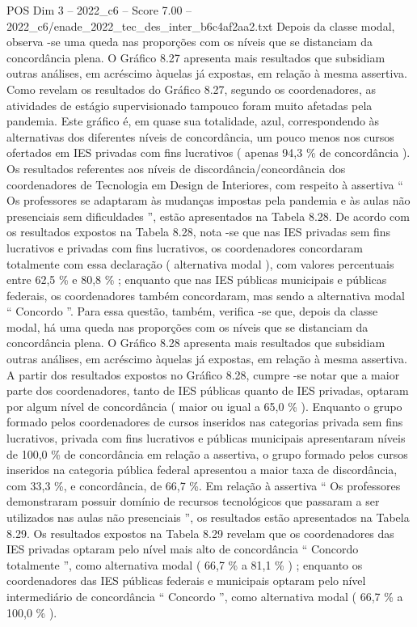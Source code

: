 \begin{textsample}{POS Dim 3 – 2022\_c6 – Score 7.00 – 2022\_c6/enade\_2022\_tec\_des\_inter\_b6c4af2aa2.txt}
Depois da classe modal, observa -se uma queda nas proporções com os níveis que se distanciam da concordância plena.
O Gráfico 8.27 apresenta mais resultados que subsidiam outras análises, em acréscimo àquelas já expostas, em relação à mesma assertiva.
Como revelam os resultados do Gráfico 8.27, segundo os coordenadores, as atividades de estágio supervisionado tampouco foram muito afetadas pela pandemia.
Este gráfico é, em quase sua totalidade, azul, correspondendo às alternativas dos diferentes níveis de concordância, um pouco menos nos cursos ofertados em IES privadas com fins lucrativos ( apenas 94,3 \% de concordância ).
Os resultados referentes aos níveis de discordância/concordância dos coordenadores de Tecnologia em Design de Interiores, com respeito à assertiva “ Os professores se adaptaram às mudanças impostas pela pandemia e às aulas não presenciais sem dificuldades ”, estão apresentados na Tabela 8.28.
De acordo com os resultados expostos na Tabela 8.28, nota -se que nas IES privadas sem fins lucrativos e privadas com fins lucrativos, os coordenadores concordaram totalmente com essa declaração ( alternativa modal ), com valores percentuais entre 62,5 \% e 80,8 \% ; enquanto que nas IES públicas municipais e públicas federais, os coordenadores também concordaram, mas sendo a alternativa modal “ Concordo ”.
Para essa questão, também, verifica -se que, depois da classe modal, há uma queda nas proporções com os níveis que se distanciam da concordância plena.
O Gráfico 8.28 apresenta mais resultados que subsidiam outras análises, em acréscimo àquelas já expostas, em relação à mesma assertiva.
A partir dos resultados expostos no Gráfico 8.28, cumpre -se notar que a maior parte dos coordenadores, tanto de IES públicas quanto de IES privadas, optaram por algum nível de concordância ( maior ou igual a 65,0 \% ).
Enquanto o grupo formado pelos coordenadores de cursos inseridos nas categorias privada sem fins lucrativos, privada com fins lucrativos e públicas municipais apresentaram níveis de 100,0 \% de concordância em relação a assertiva, o grupo formado pelos cursos inseridos na categoria pública federal apresentou a maior taxa de discordância, com 33,3 \%, e concordância, de 66,7 \%.
Em relação à assertiva “ Os professores demonstraram possuir domínio de recursos tecnológicos que passaram a ser utilizados nas aulas não presenciais ”, os resultados estão apresentados na Tabela 8.29.
Os resultados expostos na Tabela 8.29 revelam que os coordenadores das IES privadas optaram pelo nível mais alto de concordância “ Concordo totalmente ”, como alternativa modal ( 66,7 \% a 81,1 \% ) ; enquanto os coordenadores das IES públicas federais e municipais optaram pelo nível intermediário de concordância “ Concordo ”, como alternativa modal ( 66,7 \% a 100,0 \% ).

\end{textsample}
